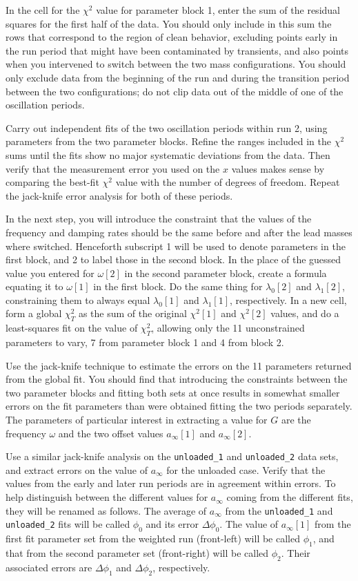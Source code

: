 \documentclass{revtex4}
\begin{document}
In the cell for the $\chi^2$ value for parameter block 1, enter the sum of
the residual squares for the first half of the data.  You should only include
in this sum the rows that correspond to the region of clean behavior,
excluding points early in the run period that might have been contaminated
by transients, and also points when you intervened to switch between the two
mass configurations.  You should only exclude data from the beginning of the
run and during the transition period between the two configurations; do not
clip data out of the middle of one of the oscillation periods.

Carry out independent fits of the two oscillation periods within run 2,
using parameters from the two parameter blocks.  Refine the ranges included
in the $\chi^2$ sums until the fits show no major systematic deviations
from the data.  Then verify that the measurement error you used on the
$x$ values makes sense by comparing the best-fit $\chi^2$ value with
the number of degrees of freedom.  Repeat the jack-knife error analysis
for both of these periods.

In the next step, you will introduce the constraint that the values of
the frequency and damping rates should be the same before and after the
lead masses where switched.  Henceforth subscript 1 will be used to denote
parameters in the first block, and 2 to label those in the second block.
In the place of the guessed value you entered for $\omega[2]$ in the second
parameter block, create a formula equating it to $\omega[1]$ in the first
block.  Do the same thing for $\lambda_0[2]$ and $\lambda_1[2]$, constraining
them to always equal $\lambda_0[1]$ and $\lambda_1[1]$, respectively.  In a
new cell, form a global $\chi_T^2$ as the sum of the original $\chi^2[1]$
and $\chi^2[2]$ values, and do a least-squares fit on the value of $\chi_T^2$,
allowing only the 11 unconstrained parameters to vary, 7 from parameter block
1 and 4 from block 2.

Use the jack-knife technique to estimate the errors on the 11 parameters
returned from the global fit.  You should find that introducing the
constraints between the two parameter blocks and fitting both sets at once
results in somewhat smaller errors on the fit parameters than were obtained
fitting the two periods separately.  The parameters of particular interest
in extracting a value for $G$ are the frequency $\omega$ and the two
offset values $a_{\infty}[1]$ and $a_{\infty}[2]$.

Use a similar jack-knife analysis on the {\tt unloaded\_1} and
{\tt unloaded\_2} data sets, and extract errors on the value of $a_{\infty}$
for the unloaded case.  Verify that the values from the early and later
run periods are in agreement within errors.  To help distinguish between the
different values for $a_{\infty}$ coming from the different fits, they will
be renamed as follows.  The average of $a_{\infty}$ from the {\tt unloaded\_1}
and {\tt unloaded\_2} fits will be called $\phi_0$ and its error
$\Delta\phi_0$.  The value of $a_{\infty}[1]$ from the first fit parameter
set from the weighted run (front-left) will be called $\phi_1$, and that from
the second parameter set (front-right) will be called $\phi_2$.
Their associated errors are $\Delta\phi_1$ and $\Delta\phi_2$, respectively.
\end{document}
